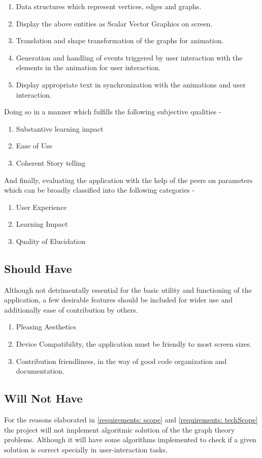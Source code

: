 \begin{enumerate}
\item Data structures which represent vertices, edges and graphs.
\item Display the above entities as Scalar Vector Graphics on screen.
\item Translation and shape transformation of the graphs for animation.
\item Generation and handling of events triggered by user interaction with the elements in the animation for user interaction.
\item Display appropriate text in synchronization with the animations and user interaction.
\end{enumerate}

Doing so in a manner which fulfills the following subjective qualities -

\begin{enumerate}
\item Substantive learning impact
\item Ease of Use
\item Coherent Story telling
\end{enumerate}

And finally, evaluating the application with the help of the peers on
parameters which can be broadly classified into the following categories -

\begin{enumerate}
\item User Experience
\item Learning Impact
\item Quality of Elucidation
\end{enumerate}

\subsection{Should Have}
Although not detrimentally essential for the basic utility and functioning of
the application, a few desirable features should be included for wider use and
additionally ease of contribution by others. 
\begin{enumerate}
\item Pleasing Aesthetics
\item Device Compatibility, the application must be friendly to most screen sizes.
\item Contribution friendliness, in the way of good code organization and documentation.
\end{enumerate}

\subsection{Will Not Have}
For the reasons elaborated in \autoref{requirements: scope} and
\autoref{requirements: techScope} the project will not implement algoritmic
solution of the the graph theory problems.  Although it will have some
algorithms implemented to check if a given solution is correct specially in
user-interaction tasks.

